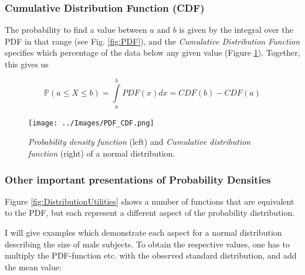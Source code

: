 \subsubsection{Cumulative Distribution Function (CDF)}

The probability to find a value between $a$ and $b$ is given by the integral over the PDF in that range (see Fig. \ref{fig:PDF}), and the \emph{Cumulative Distribution Function} specifies which percentage of the data below any given value (Figure \ref{fig:CDF}). Together, this gives us

\begin{equation}
   \mathbb{P}(a \leq X \leq b) = \int\limits_a^b {PDF(x)dx} = CDF(b) - CDF(a)
\end{equation}


\begin{figure}[ht]
  \centering
  \texttt{[image: ../Images/PDF\_CDF.png]}\\
  \caption{\emph{Probability density function} (left) and \emph{Cumulative distribution function} (right) of a normal distribution.}\label{fig:CDF}
\end{figure}

\subsubsection{Other important presentations of Probability Densities}

Figure \ref{fig:DistributionUtilities} shows a number of functions that are equivalent to the PDF, but each represent a different aspect of the probability distribution.

I will give examples which demonstrate each aspect for a normal distribution describing the size of male subjects. To obtain the respective values, one has to multiply the PDF-function etc. with the observed standard distribution, and add the mean value:

